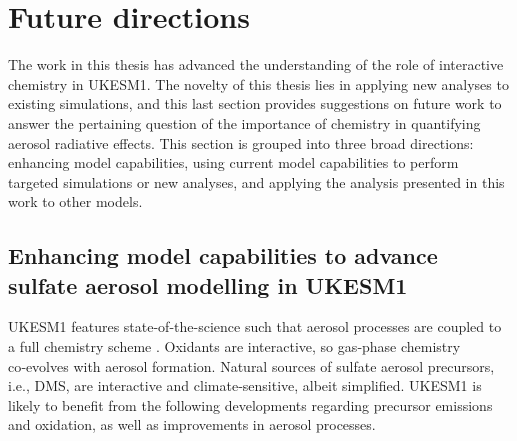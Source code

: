 \section{Future directions}


The work in this thesis has advanced the understanding of the role of interactive chemistry in UKESM1. The novelty of this thesis lies in applying new analyses to existing simulations, and this last section provides suggestions on future work to answer the pertaining question of the importance of chemistry in quantifying aerosol radiative effects. This section is grouped into three broad directions: enhancing model capabilities, using current model capabilities to perform targeted simulations or new analyses, and applying the analysis presented in this work to other models. 

\subsection{Enhancing model capabilities to advance sulfate aerosol modelling in UKESM1}

UKESM1 features state-of-the-science such that aerosol processes are coupled to a full chemistry scheme \citep[][]{archibaldDescriptionEvaluationUKCA2020, mulcahyDescriptionEvaluationAerosol2020,sellarUKESM1DescriptionEvaluation2019}. Oxidants are interactive, so gas‑phase chemistry co‑evolves with aerosol formation. Natural sources of sulfate aerosol precursors, i.e., DMS, are interactive and climate‑sensitive, albeit simplified. UKESM1 is likely to benefit from the following developments regarding  precursor emissions and oxidation, as well as improvements in aerosol processes. 

